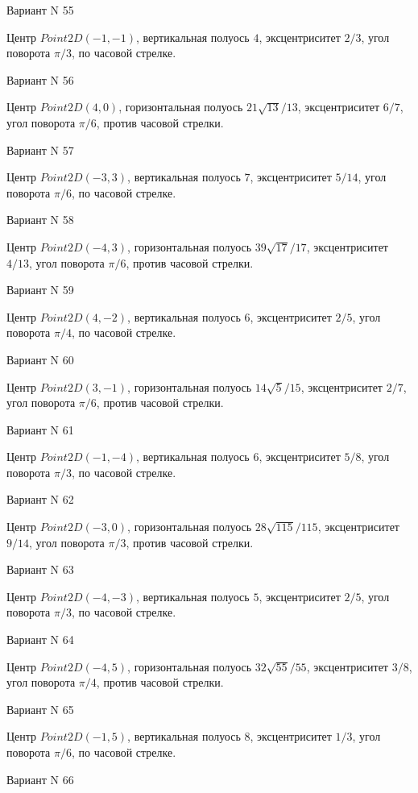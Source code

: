 \documentclass[11pt]{report}
\begin{document}
Вариант N 55

Центр $Point2D\left(-1, -1\right)$, вертикальная полуось $4$, эксцентриситет $2 / 3$, угол поворота $\pi / 3$, по часовой стрелке.

Вариант N 56

Центр $Point2D\left(4, 0\right)$, горизонтальная полуось $21 \sqrt{13} / 13$, эксцентриситет $6 / 7$, угол поворота $\pi / 6$, против часовой стрелки.

Вариант N 57

Центр $Point2D\left(-3, 3\right)$, вертикальная полуось $7$, эксцентриситет $5 / 14$, угол поворота $\pi / 6$, по часовой стрелке.

Вариант N 58

Центр $Point2D\left(-4, 3\right)$, горизонтальная полуось $39 \sqrt{17} / 17$, эксцентриситет $4 / 13$, угол поворота $\pi / 6$, против часовой стрелки.

Вариант N 59

Центр $Point2D\left(4, -2\right)$, вертикальная полуось $6$, эксцентриситет $2 / 5$, угол поворота $\pi / 4$, по часовой стрелке.

Вариант N 60

Центр $Point2D\left(3, -1\right)$, горизонтальная полуось $14 \sqrt{5} / 15$, эксцентриситет $2 / 7$, угол поворота $\pi / 6$, против часовой стрелки.

Вариант N 61

Центр $Point2D\left(-1, -4\right)$, вертикальная полуось $6$, эксцентриситет $5 / 8$, угол поворота $\pi / 3$, по часовой стрелке.

Вариант N 62

Центр $Point2D\left(-3, 0\right)$, горизонтальная полуось $28 \sqrt{115} / 115$, эксцентриситет $9 / 14$, угол поворота $\pi / 3$, против часовой стрелки.

Вариант N 63

Центр $Point2D\left(-4, -3\right)$, вертикальная полуось $5$, эксцентриситет $2 / 5$, угол поворота $\pi / 3$, по часовой стрелке.

Вариант N 64

Центр $Point2D\left(-4, 5\right)$, горизонтальная полуось $32 \sqrt{55} / 55$, эксцентриситет $3 / 8$, угол поворота $\pi / 4$, против часовой стрелки.

Вариант N 65

Центр $Point2D\left(-1, 5\right)$, вертикальная полуось $8$, эксцентриситет $1 / 3$, угол поворота $\pi / 6$, по часовой стрелке.

Вариант N 66
\end{document}
